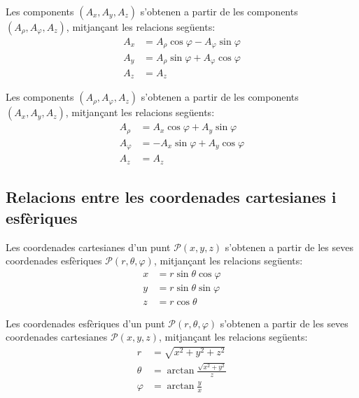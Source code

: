 \documentclass[catalan,a4paper,twoside,11pt]{article}
\begin{document}
Les components $(A_x, A_y, A_z)$  s'obtenen a partir de les  components  $(A_\rho, A_\varphi, A_z)$, mitjançant les relacions següents:
\begin{subequations}\begin{align}
    A_x &=A_\rho \cos\varphi -A_\varphi\sin\varphi \\
    A_y &=A_\rho\sin\varphi +A_\varphi\cos\varphi\\
    A_z &= A_z
\end{align}\end{subequations}

Les components  $(A_\rho, A_\varphi, A_z)$ s'obtenen a partir de les  components $(A_x, A_y, A_z)$, mitjançant les relacions següents:
\begin{subequations}\begin{align}
    A_\rho &=  A_x\cos\varphi+A_y\sin\varphi\\
    A_\varphi &= -A_x\sin\varphi+A_y\cos\varphi \\
    A_z &= A_z
\end{align}\end{subequations}


\subsection{Relacions entre les coordenades cartesianes i
esfèriques}

Les coordenades cartesianes  d'un punt $\mathscr{P}(x,y,z)$ s'obtenen a partir
de les seves coordenades esfèriques $\mathscr{P}(r,\theta,\varphi)$,
mitjançant les relacions següents:
\begin{subequations}\begin{align}
    x &=r\sin\theta\cos\varphi \\ y &=r\sin\theta\sin\varphi \\ z &=r\cos\theta
\end{align}\end{subequations}

Les coordenades  esfèriques  d'un punt $\mathscr{P}(r,\theta,\varphi)$
s'obtenen a partir de les seves coordenades cartesianes $\mathscr{P}(x,y,z)$,
mitjançant les relacions següents:
\begin{subequations}\begin{align}
    r &=\sqrt{x^2+y^2+z^2}\\
    \theta&=\arctan{\frac{\sqrt{x^2+y^2}}{z}}\\[1mm]
    \varphi &=\arctan\frac{y}{x}
\end{align}\end{subequations}
\end{document}
